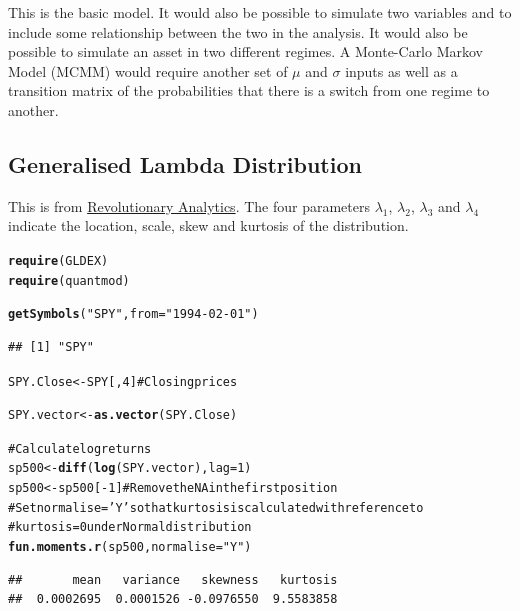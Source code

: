 \documentclass[12pt, a4paper, oneside]{article}\usepackage{graphicx, color}
\makeatletter
\newcommand{\hlfunctioncall}[1]{\textcolor[rgb]{0.501960784313725,0,0.329411764705882}{\textbf{#1}}}%
\newcommand{\hlstring}[1]{\textcolor[rgb]{0.6,0.6,1}{#1}}%
\newcommand{\hlcomment}[1]{\textcolor[rgb]{0.180392156862745,0.6,0.341176470588235}{#1}}%
\newenvironment{kframe}{%
 \def\at@end@of@kframe{}%
 \ifinner\ifhmode%
  \def\at@end@of@kframe{\end{minipage}}%
  \begin{minipage}{\columnwidth}%
 \fi\fi%
 \def\FrameCommand##1{\hskip\@totalleftmargin \hskip-\fboxsep
 \colorbox{shadecolor}{##1}\hskip-\fboxsep
     \hskip-\linewidth \hskip-\@totalleftmargin \hskip\columnwidth}%
 \MakeFramed {\advance\hsize-\width
   \@totalleftmargin\z@ \linewidth\hsize
   \@setminipage}}%
 {\par\unskip\endMakeFramed%
 \at@end@of@kframe}
\newenvironment{knitrout}{}{} %
\makeatother
\begin{document}
This is the basic model.  It would also be possible to simulate two variables and to include some relationship between the two in the analysis.  It would also be possible to simulate an asset in two different regimes. A Monte-Carlo Markov Model (MCMM) would require another set of $\mu$ and $\sigma$ inputs as well as a transition matrix of the probabilities that there is a switch from one regime to another. 
 
\subsection{Generalised Lambda Distribution}
This is from \href{http://blog.revolutionanalytics.com/2014/02/quantitative-finance-applications-in-r-4-using-the-generalized-lambda-distribution-to-simulate-market-returns.html}{Revolutionary Analytics}.  The four parameters $\lambda_1$, $\lambda_2$, $\lambda_3$ and $\lambda_4$ indicate the location, scale, skew and kurtosis of the distribution. 

\begin{knitrout}
\color{fgcolor}\begin{kframe}
\begin{alltt}
\hlfunctioncall{require}(GLDEX)
\hlfunctioncall{require}(quantmod)

\hlfunctioncall{getSymbols}(\hlstring{"SPY"}, from = \hlstring{"1994-02-01"})
\end{alltt}
\begin{verbatim}
## [1] "SPY"
\end{verbatim}
\begin{alltt}
SPY.Close <- SPY[, 4]  \hlcomment{# Closing prices}

SPY.vector <- \hlfunctioncall{as.vector}(SPY.Close)

\hlcomment{# Calculate log returns}
sp500 <- \hlfunctioncall{diff}(\hlfunctioncall{log}(SPY.vector), lag = 1)
sp500 <- sp500[-1]  \hlcomment{# Remove the NA in the first position}
\hlcomment{# Set normalise='Y' so that kurtosis is calculated with reference to}
\hlcomment{# kurtosis = 0 under Normal distribution}
\hlfunctioncall{fun.moments.r}(sp500, normalise = \hlstring{"Y"})
\end{alltt}
\begin{verbatim}
##       mean   variance   skewness   kurtosis 
##  0.0002695  0.0001526 -0.0976550  9.5583858
\end{verbatim}
\end{kframe}
\end{knitrout}
\end{document}
